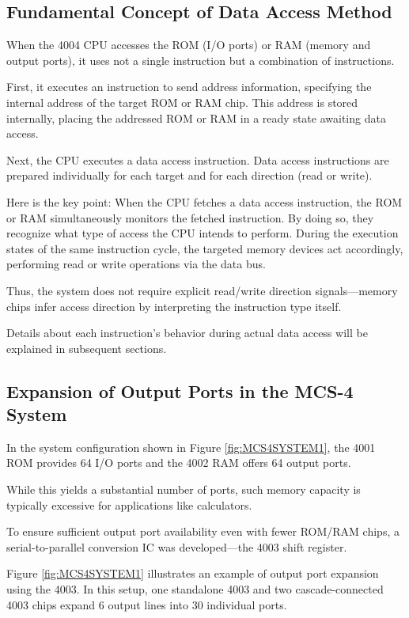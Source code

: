 \subsection{Fundamental Concept of Data Access Method}
When the 4004 CPU accesses the ROM (I/O ports) or RAM (memory and output ports), it uses not a single instruction but a combination of instructions.

First, it executes an instruction to send address information, specifying the internal address of the target ROM or RAM chip.  
This address is stored internally, placing the addressed ROM or RAM in a ready state awaiting data access.

Next, the CPU executes a data access instruction.  
Data access instructions are prepared individually for each target and for each direction (read or write).

Here is the key point:  
When the CPU fetches a data access instruction, the ROM or RAM simultaneously monitors the fetched instruction.  
By doing so, they recognize what type of access the CPU intends to perform.  
During the execution states of the same instruction cycle, the targeted memory devices act accordingly, performing read or write operations via the data bus.

Thus, the system does not require explicit read/write direction signals—memory chips infer access direction by interpreting the instruction type itself.

Details about each instruction's behavior during actual data access will be explained in subsequent sections.

\subsection{Expansion of Output Ports in the MCS-4 System}
In the system configuration shown in Figure \ref{fig:MCS4SYSTEM1}, the 4001 ROM provides 64 I/O ports and the 4002 RAM offers 64 output ports.  

While this yields a substantial number of ports, such memory capacity is typically excessive for applications like calculators.

To ensure sufficient output port availability even with fewer ROM/RAM chips, a serial-to-parallel conversion IC was developed—the 4003 shift register.

Figure \ref{fig:MCS4SYSTEM1} illustrates an example of output port expansion using the 4003.  
In this setup, one standalone 4003 and two cascade-connected 4003 chips expand 6 output lines into 30 individual ports.


